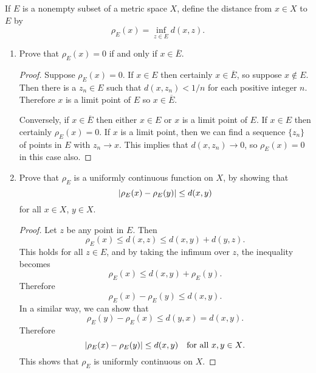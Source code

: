  If $E$ is a nonempty subset of a metric space $X$,
define the distance from $x\in X$ to $E$ by
\begin{equation*}
  \rho_E(x) = \inf_{z\in E} d(x,z).
\end{equation*}
\begin{enumerate}
\item Prove that $\rho_E(x) = 0$ if and only if $x\in\overline{E}$.
  \begin{proof}
    Suppose $\rho_E(x) = 0$. If $x\in E$ then certainly
    $x\in\overline{E}$, so suppose $x\not\in E$. Then there is a
    $z_n\in E$ such that $d(x,z_n) < 1/n$ for each positive integer
    $n$. Therefore $x$ is a limit point of $E$ so $x\in\overline{E}$.

    Conversely, if $x\in\overline{E}$ then either $x\in E$ or $x$ is a
    limit point of $E$. If $x\in E$ then certainly $\rho_E(x) = 0$. If
    $x$ is a limit point, then we can find a sequence $\{z_n\}$ of
    points in $E$ with $z_n\to x$. This implies that $d(x,z_n)\to0$,
    so $\rho_E(x) = 0$ in this case also.
  \end{proof}
\item Prove that $\rho_E$ is a uniformly continuous function on $X$,
  by showing that
  \begin{equation*}
    \lvert{\rho_E(x) - \rho_E(y)}\rvert \leq d(x,y)
  \end{equation*}
  for all $x\in X$, $y\in X$.
  \begin{proof}
    Let $z$ be any point in $E$. Then
    \begin{equation*}
      \rho_E(x) \leq d(x,z) \leq d(x,y) + d(y,z).
    \end{equation*}
    This holds for all $z\in E$, and by taking the infimum over $z$,
    the inequality becomes
    \begin{equation*}
      \rho_E(x) \leq d(x,y) + \rho_E(y).
    \end{equation*}
    Therefore
    \begin{equation*}
      \rho_E(x) - \rho_E(y) \leq d(x,y).
    \end{equation*}
    In a similar way, we can show that
    \begin{equation*}
      \rho_E(y) - \rho_E(x) \leq d(y,x) = d(x,y).
    \end{equation*}
    Therefore
    \begin{equation*}
      \lvert{\rho_E(x) - \rho_E(y)}\rvert \leq d(x,y)
      \quad\text{for all $x,y\in X$}.
    \end{equation*}
    This shows that $\rho_E$ is uniformly continuous on $X$.
  \end{proof}
\end{enumerate}

